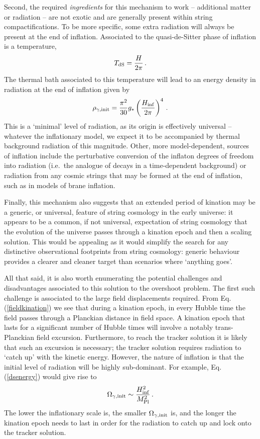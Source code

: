 Second, the required \emph{ingredients} for this mechanism to work -- additional matter or radiation -- are not exotic and are generally present within string compactifications. To be more specific, some extra radiation will always be present at the end of inflation. Associated to the quasi-de-Sitter phase of inflation is a temperature,
\begin{equation}
T_{\rm dS} = \frac{H}{2 \pi}\,.
\end{equation}
The thermal bath associated to this temperature will lead to an energy density in radiation at the end of inflation given by
\begin{equation}
\label{dsenergy}
\rho_{\gamma, {\rm init}} = \frac{\pi^2}{30} g_* \left( \frac{H_{\rm inf}}{2 \pi} \right)^4\,.
\end{equation}
This is a `minimal' level of radiation, as its origin is effectively universal -- whatever the inflationary model, we expect it to be accompanied by thermal background radiation of this magnitude. Other, more model-dependent, sources of inflation include the perturbative conversion of the inflaton degrees of freedom into radiation (i.e.~the analogue of decays in a time-dependent background) or radiation from any cosmic strings that may be formed at the end of inflation, such as in models of brane inflation.

Finally, this mechanism also suggests that an extended period of kination may be a generic, or universal, feature of string cosmology in the early universe: it appears to be a common, if not universal, expectation of string cosmology that the evolution of the universe passes through a kination epoch and then a scaling solution. This would be appealing as it would simplify the search for any distinctive observational footprints from string cosmology: generic behaviour provides a clearer and cleaner target than scenarios where `anything goes'.

All that said, it is also worth enumerating the potential challenges and disadvantages associated to this solution to the overshoot problem. The first such challenge is associated to the large field displacements required. From Eq. (\ref{fieldkination}) we see that during a kination epoch, in every Hubble time the field passes through a Planckian distance in field space. A kination epoch that lasts for a significant number of Hubble times will involve a notably trans-Planckian field excursion. Furthermore, to reach the tracker solution it is likely that such an excursion is necessary; the tracker solution requires radiation to `catch up' with the kinetic energy. However, the nature of inflation is that the initial level of radiation will be highly sub-dominant. For example,  Eq. (\ref{dsenergy}) would give rise to
\begin{equation}
\Omega_{\gamma, {\rm init}} \sim \frac{H_{\rm inf}^2}{M_{\rm Pl}^2}\, .
\end{equation}
The lower the inflationary scale is, the smaller $\Omega_{\gamma, {\rm init}}$ is, and the longer the kination epoch needs to last in order for the radiation to catch up and lock onto the tracker solution.

